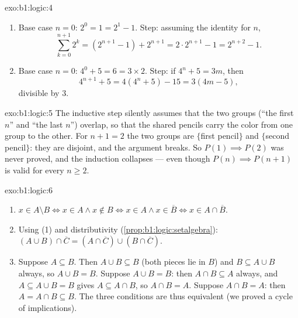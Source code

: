 \begin{solution}{exo:b1:logic:4}
\begin{enumerate}
  \item Base case $n = 0$: $2^0 = 1 = 2^1 - 1$. Step: assuming the
        identity for $n$,
        \[
        \sum_{k=0}^{n+1} 2^k = (2^{n+1} - 1) + 2^{n+1}
        = 2 \cdot 2^{n+1} - 1 = 2^{n+2} - 1 .
        \]
  \item Base case $n = 0$: $4^0 + 5 = 6 = 3 \times 2$. Step: if
        $4^n + 5 = 3m$, then
        \[
        4^{n+1} + 5 = 4(4^n + 5) - 15 = 3(4m - 5),
        \]
        divisible by $3$.
\end{enumerate}
\end{solution}

\begin{solution}{exo:b1:logic:5}
The inductive step silently assumes that the two groups (``the first
$n$'' and ``the last $n$'') overlap, so that the shared pencils carry
the color from one group to the other. For $n + 1 = 2$ the two groups
are $\{$first pencil$\}$ and $\{$second pencil$\}$: they are disjoint,
and the argument breaks. So $P(1) \implies P(2)$ was never proved, and
the induction collapses --- even though $P(n) \implies P(n+1)$ is
valid for every $n \geq 2$.
\end{solution}

\begin{solution}{exo:b1:logic:6}
\begin{enumerate}
  \item $x \in A \setminus B \iff x \in A \land x \notin B \iff x \in
        A \land x \in \overline{B} \iff x \in A \cap \overline{B}$.
  \item Using (1) and distributivity
        (\cref{prop:b1:logic:setalgebra}):
        $(A \cup B) \cap \overline{C} = (A \cap \overline{C}) \cup
        (B \cap \overline{C})$.
  \item Suppose $A \subseteq B$. Then $A \cup B \subseteq B$ (both
        pieces lie in $B$) and $B \subseteq A \cup B$ always, so
        $A \cup B = B$. Suppose $A \cup B = B$: then $A \cap B
        \subseteq A$ always, and $A \subseteq A \cup B = B$ gives
        $A \subseteq A \cap B$, so $A \cap B = A$. Suppose $A \cap B =
        A$: then $A = A \cap B \subseteq B$. The three conditions are
        thus equivalent (we proved a cycle of implications).
\end{enumerate}
\end{solution}

